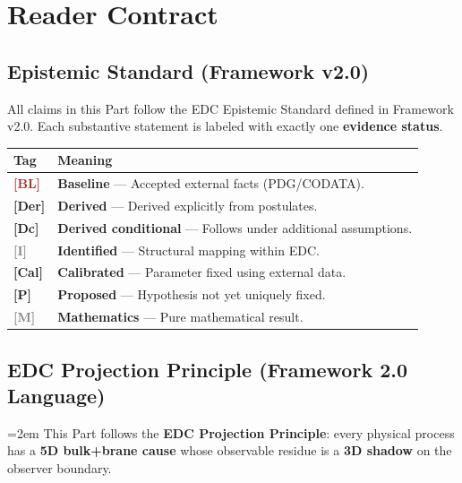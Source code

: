 \documentclass[11pt,a4paper]{book}
\theoremstyle{definition}
\theoremstyle{remark}
\newcommand{\tagBL}{\textcolor{brown}{\textbf{[BL]}}}
\newcommand{\tagDer}{\textcolor{derivedColor}{\textbf{[Der]}}}
\newcommand{\tagDc}{\textcolor{calibratedColor}{\textbf{[Dc]}}}
\newcommand{\tagI}{\textcolor{gray}{\textbf{[I]}}}
\newcommand{\tagCal}{\textcolor{postulatedColor}{\textbf{[Cal]}}}
\newcommand{\tagP}{\textcolor{postulatedColor}{\textbf{[P]}}}
\newcommand{\tagM}{\textcolor{gray}{\textbf{[M]}}}
\begin{document}
\tableofcontents

\chapter*{Reader Contract}

\section*{Epistemic Standard (Framework v2.0)}

All claims in this Part follow the EDC Epistemic Standard defined in Framework v2.0.
Each substantive statement is labeled with exactly one \textbf{evidence status}.

\begin{center}
\begin{tabular}{@{}lp{10cm}@{}}
\toprule
\textbf{Tag} & \textbf{Meaning} \\
\midrule
\tagBL{}  & \textbf{Baseline} --- Accepted external facts (PDG/CODATA). \\
\tagDer{} & \textbf{Derived} --- Derived explicitly from postulates. \\
\tagDc{}  & \textbf{Derived conditional} --- Follows under additional assumptions. \\
\tagI{}   & \textbf{Identified} --- Structural mapping within EDC. \\
\tagCal{} & \textbf{Calibrated} --- Parameter fixed using external data. \\
\tagP{}   & \textbf{Proposed} --- Hypothesis not yet uniquely fixed. \\
\tagM{}   & \textbf{Mathematics} --- Pure mathematical result. \\
\bottomrule
\end{tabular}
\end{center}

\section*{EDC Projection Principle (Framework 2.0 Language)}

{%
\emergencystretch=2em
This Part follows the \textbf{EDC Projection Principle}: every physical process
has a \textbf{5D bulk+brane cause} whose observable residue is a \textbf{3D shadow}
on the observer boundary.\par
}%
\end{document}

